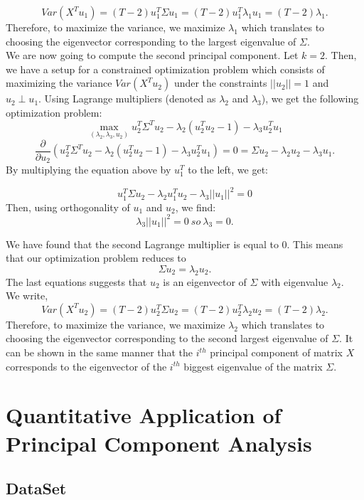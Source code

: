 \documentclass{article}
\begin{document}
$$Var(X^{T}u_1)=(T-2)u_{1}^{T}\Sigma u_1=(T-2)u_{1}^{T}\lambda_{1}u_{1}=(T-2)\lambda_1.$$
Therefore, to maximize the variance, we maximize $\lambda_1 $ which translates to choosing  the eigenvector corresponding to the largest eigenvalue of $\Sigma$.
\\
We are now going to compute the second principal component. Let $k=2$. Then, we have a setup for a constrained optimization problem which consists of maximizing the variance $Var(X^{T}u_2)$ under the constraints $\vert\vert u_{2} \vert\vert = 1$ and $u_2 \perp u_1$. Using Lagrange multipliers (denoted as $\lambda_{2}$ and $\lambda_{3}$), we get the following optimization problem:\\


$$\max_{(\lambda_{2}, \lambda_{3},u_{2})}u_{2}^{T}\Sigma^{T}u_{2}-\lambda_{2}(u_{2}^{T}u_{2}-1) - \lambda_{3} u_2^T u_1$$
$$\frac{\partial}{\partial u_2}(u_{2}^{T}\Sigma^{T}u_{2}-\lambda_{2}(u_{2}^{T}u_{2}-1) - \lambda_3 u_2^T u_1)=0=\Sigma u_2 - \lambda_2 u_2 - \lambda_3 u_1 .$$
By multiplying the equation above by $u_1^T$ to the left, we get:

$$
u_1^T \Sigma u_2  -  \lambda_2 u_1^T u_2 - \lambda_3 \vert\vert u_1 \vert\vert^2 = 0
$$
Then, using orthogonality of $u_1$ and $u_2$, we find:
$$\lambda_3 \vert\vert u_1 \vert\vert^2 = 0 \ so\ \lambda_3 = 0.$$

We have found that the second Lagrange multiplier is equal to 0. This means that our optimization problem reduces to \\
$$\Sigma u_2 = \lambda_{2}u_2.$$
The last equations suggests that $u_2$ is an eigenvector of $\Sigma$ with eigenvalue $\lambda_2$.\\ We write, 
$$Var(X^{T}u_2)=(T-2)u_{2}^{T}\Sigma u_2=(T-2)u_{2}^{T}\lambda_{2}u_{2}=(T-2)\lambda_2.$$
Therefore, to maximize the variance, we maximize $\lambda_2 $ which translates to choosing  the eigenvector corresponding to the second largest eigenvalue of $\Sigma$.
It can be shown in the same manner that the $i^{th}$ principal component of matrix $X$ corresponds to the eigenvector of the $i^{th}$ biggest eigenvalue of the matrix $\Sigma$.






\section{Quantitative Application of Principal Component Analysis}

\subsection{DataSet}
\end{document}
